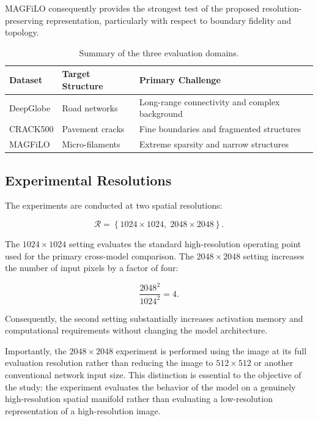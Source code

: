 \documentclass[11pt,a4paper]{article}
\begin{document}
MAGFiLO consequently provides the strongest test of the proposed 
resolution-preserving representation, particularly with respect to boundary 
fidelity and topology.

\begin{table}[t]
\centering
\caption{Summary of the three evaluation domains.}
\label{tab:datasets}
\setlength{\tabcolsep}{6pt}
\renewcommand{\arraystretch}{1.15}
\begin{tabular}{lll}
\toprule
\textbf{Dataset} &
\textbf{Target Structure} &
\textbf{Primary Challenge} \\
\midrule
DeepGlobe &
Road networks &
Long-range connectivity and complex background \\
CRACK500 &
Pavement cracks &
Fine boundaries and fragmented structures \\
MAGFiLO &
Micro-filaments &
Extreme sparsity and narrow structures \\
\bottomrule
\end{tabular}
\end{table}


\subsection{Experimental Resolutions}

The experiments are conducted at two spatial resolutions:

\begin{equation}
\mathcal{R} = \left\{1024\times1024,\;2048\times2048\right\}.
\end{equation}

The $1024\times1024$ setting evaluates the standard high-resolution operating 
point used for the primary cross-model comparison. The $2048\times2048$ 
setting increases the number of input pixels by a factor of four:

\begin{equation}
\frac{2048^2}{1024^2}=4.
\end{equation}

Consequently, the second setting substantially increases activation memory 
and computational requirements without changing the model architecture.

Importantly, the $2048\times2048$ experiment is performed using the image 
at its full evaluation resolution rather than reducing the image to 
$512\times512$ or another conventional network input size. This distinction 
is essential to the objective of the study: the experiment evaluates the 
behavior of the model on a genuinely high-resolution spatial manifold 
rather than evaluating a low-resolution representation of a high-resolution 
image.
\end{document}
